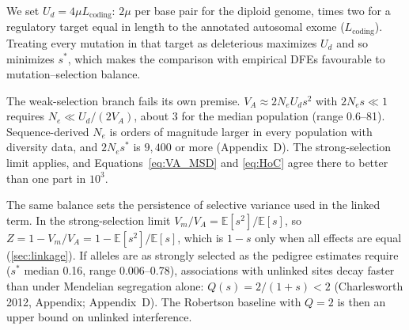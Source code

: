\documentclass[12pt]{article}
\begin{document}
We set $U_d = 4\mu L_\text{coding}$: $2\mu$ per base pair for the diploid genome, times two for a regulatory target equal in length to the annotated autosomal exome ($L_\text{coding}$). Treating every mutation in that target as deleterious maximizes $U_d$ and so minimizes $s^*$, which makes the comparison with empirical DFEs favourable to mutation--selection balance.

The weak-selection branch fails its own premise. $V_A \approx 2N_eU_ds^2$ with $2N_es \ll 1$ requires $N_e \ll U_d/(2V_A)$, about 3 for the median population (range 0.6--81). Sequence-derived $N_e$ is orders of magnitude larger in every population with diversity data, and $2N_es^*$ is $9{,}400$ or more (Appendix~D). The strong-selection limit applies, and Equations~\eqref{eq:VA_MSD} and \eqref{eq:HoC} agree there to better than one part in $10^3$.

The same balance sets the persistence of selective variance used in the linked term. In the strong-selection limit $V_m/V_A = \mathbb{E}[s^2]/\mathbb{E}[s]$, so $Z = 1 - V_m/V_A = 1 - \mathbb{E}[s^2]/\mathbb{E}[s]$, which is $1 - s$ only when all effects are equal (\autoref{sec:linkage}). If alleles are as strongly selected as the pedigree estimates require ($s^*$ median 0.16, range 0.006--0.78), associations with unlinked sites decay faster than under Mendelian segregation alone: $Q(s) = 2/(1+s) < 2$ (Charlesworth 2012, Appendix; Appendix~D). The Robertson baseline with $Q = 2$ is then an upper bound on unlinked interference.
\end{document}

